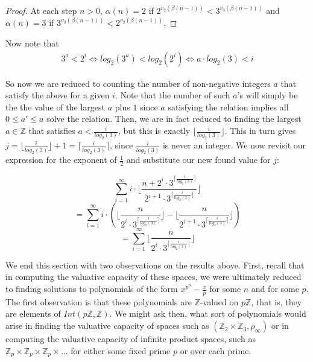 \begin{proof}
At each step $n > 0$, $\alpha(n) = 2$ if $2^{v_2(\beta(n-1))} < 3^{v_3(\beta(n-1))}$ and  $\alpha(n) = 3$ if $3^{v_3(\beta(n-1))} < 2^{v_2(\beta(n-1))}$.
\end{proof}

 Now note that  
\begin{align}
3^a < 2^i
 \iff
 log_2(3^a) < log_2(2^i)
\iff  
a \cdot log_2(3) < i
\end{align}

So now we are reduced to counting the number of non-negative integers $a$ that satisfy the above for a given $i$.  Note that the number of such $a$'s will simply be the the value of the largest $a$ plus $1$ since $a$ satisfying the relation implies all $0 \leq a' \leq a$ solve the relation. Then, we are in fact reduced to finding the largest $a \in \mathbb{Z}$ that satisfies $a < \frac{i}{log_2(3)}$, but this is exactly $\lfloor \frac{i}{log_2(3)}\rfloor$. This in turn gives $j =  \lfloor \frac{i}{log_2(3)}\rfloor + 1= \lceil \frac{i}{log_2(3)}\rceil$, since $\frac{i}{log_2(3)}$ is never an integer. We now revisit our expression for the exponent of $\frac{1}{2}$ and substitute our new found value for $j$:
 
\[\sum_{i=1}^\infty i \cdot \lfloor\frac{n + 2^i \cdot 3^{\lceil \frac{i}{log_2(3)}\rceil}}{2^{i+1}\cdot 3^{\lceil \frac{i}{log_2(3)}\rceil}} \rfloor\]
\[=\sum_{i=1}^\infty i \cdot (\lfloor\frac{n}{2^i \cdot 3^{\lceil \frac{i}{log_2(3)}\rceil }}\rfloor -  \lfloor\frac{n}{2^{i+1}\cdot 3^{\lceil \frac{i}{log_2(3)}\rceil}} \rfloor)\]
\[=\sum_{i=1}^\infty \lfloor\frac{n}{2^i \cdot3^{\lceil \frac{i}{log_2(3)}\rceil }}\rfloor\]



We end this section with two observations on the results above.  First, recall that in computing the valuative capacity of these spaces, we were ultimately reduced to finding solutions to polynomials of the form $x^{p^n} - \frac{x}{p}$ for some $n$ and for some $p$. The first observation is that these polynomials are $\mathbb{Z}$-valued on $p\mathbb{Z}$, that is, they are elements of $Int(p\mathbb{Z},\mathbb{Z})$. We might ask then, what sort of polynomials would arise in finding the valuative capacity of spaces such as $(\mathbb{Z}_2 \times \mathbb{Z}_3, \rho_\infty)$ or in computing the valuative capacity of infinite product spaces, such as $\mathbb{Z}_p \times \mathbb{Z}_p \times \mathbb{Z}_p \times \ldots$ for either some fixed prime $p$ or over each prime. \\

